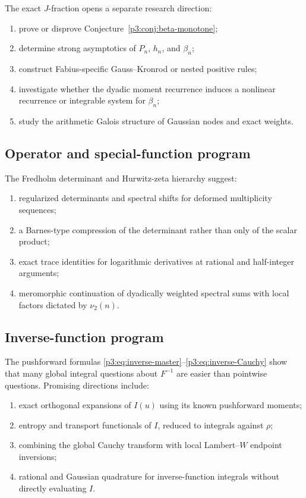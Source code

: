 \documentclass[11pt]{article}
\theoremstyle{definition}
\theoremstyle{remark}
\begin{document}
The exact \(J\)-fraction opens a separate research direction:

\begin{enumerate}
\item prove or disprove Conjecture~\ref{p3:conj:beta-monotone};
\item determine strong asymptotics of \(P_n\), \(h_n\), and \(\beta_n\);
\item construct Fabius-specific Gauss--Kronrod or nested positive rules;
\item investigate whether the dyadic moment recurrence induces a nonlinear recurrence or
      integrable system for \(\beta_n\);
\item study the arithmetic Galois structure of Gaussian nodes and exact weights.
\end{enumerate}

\subsection{Operator and special-function program}

The Fredholm determinant and Hurwitz-zeta hierarchy suggest:

\begin{enumerate}
\item regularized determinants and spectral shifts for deformed multiplicity sequences;
\item a Barnes-type compression of the determinant rather than only of the scalar product;
\item exact trace identities for logarithmic derivatives at rational and half-integer
      arguments;
\item meromorphic continuation of dyadically weighted spectral sums with local factors
      dictated by \(\nu_2(n)\).
\end{enumerate}

\subsection{Inverse-function program}

The pushforward formulas \eqref{p3:eq:inverse-master}--\eqref{p3:eq:inverse-Cauchy} show that
many global integral questions about \(F^{-1}\) are easier than pointwise questions.
Promising directions include:

\begin{enumerate}
\item exact orthogonal expansions of \(I(u)\) using its known pushforward moments;
\item entropy and transport functionals of \(I\), reduced to integrals against \(\rho\);
\item combining the global Cauchy transform with local Lambert--\(W\) endpoint inversions;
\item rational and Gaussian quadrature for inverse-function integrals without directly
      evaluating \(I\).
\end{enumerate}
\end{document}
